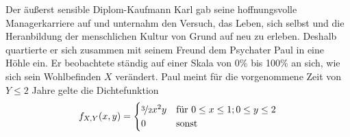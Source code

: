 \documentclass{abgabe}
\begin{document}
\begin{questions}
    \question
    Der äußerst sensible Diplom-Kaufmann Karl gab seine hoffnungsvolle Managerkarriere auf und unternahm den Versuch, das Leben, sich selbst und die Heranbildung der menschlichen Kultur von Grund auf neu zu erleben. 
    Deshalb quartierte er sich zusammen mit seinem Freund dem Psychater Paul in eine Höhle ein. 
    Er beobachtete ständig auf einer Skala von 0\% bis 100\% an sich, wie sich sein Wohlbefinden $X$ verändert.
    Paul meint für die vorgenommene Zeit von $Y \leq 2$ Jahre  gelte die Dichtefunktion
    \[ 
        f_{X,Y}(x,y) = 
        \begin{cases}
            \nicefrac{3}{2} x^2y & \text{für} \ 0 \leq x \leq 1; 0 \leq y \leq 2 \\ 
            0                    & \text{sonst}
        \end{cases}
    \]
\end{questions}
\end{document}
